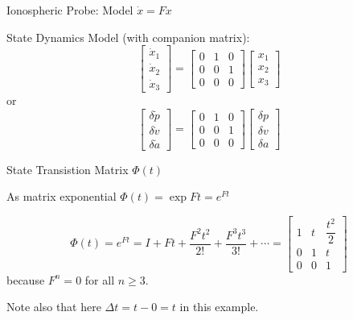 \documentclass{beamer}
\begin{document}
\begin{frame}
Ionospheric Probe: Model $\dot{x}=Fx$

State Dynamics Model (with companion matrix):
\begin{equation}
\begin{bmatrix}
\dot{x}_1\\
\dot{x}_2\\
\dot{x}_3
\end{bmatrix}
=
\begin{bmatrix}
0 &1 &0\\
0 &0 &1\\
0 &0 &0
\end{bmatrix}
\begin{bmatrix}
x_1\\
x_2\\
x_3
\end{bmatrix}
\end{equation} 
or
\[
\begin{bmatrix}
\delta\dot{p}\\
\delta\dot{v}\\
\delta\dot{a}
\end{bmatrix}
=
\begin{bmatrix}
0 &1 &0\\
0 &0 &1\\
0 &0 &0
\end{bmatrix}
\begin{bmatrix}
\delta p\\
\delta v\\
\delta a
\end{bmatrix}
\]
\end{frame}

\begin{frame}
State Transistion Matrix $\Phi(t)$

As matrix exponential $\Phi(t)=\exp{Ft}=e^{Ft}$

\begin{equation}
\Phi(t)=e^{Ft}= I + Ft + \dfrac{F^2t^2}{2!}+ \dfrac{F^3t^3}{3!}+\cdots=
\begin{bmatrix}
1 &t &\dfrac{t^2}{2}\\
0 &1 &t\\
0 &0 &1
\end{bmatrix}
\end{equation}
because $F^n=0$ for all $n\geq 3$.

Note also that here $\Delta t= t-0=t$ in this example. 
\end{frame}
\end{document}
